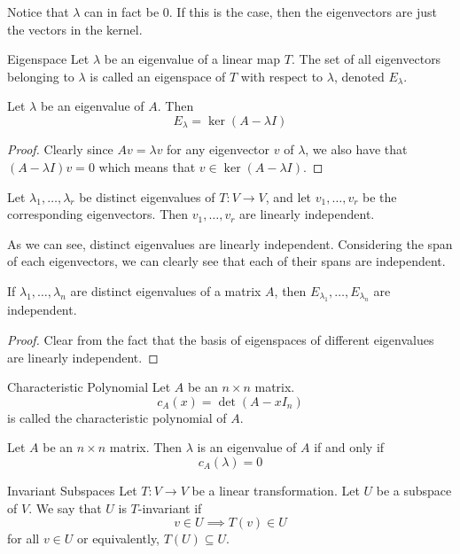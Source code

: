 Notice that $\lambda$ can in fact be $0$. If this is the case, then the eigenvectors are just the vectors in the kernel. 

\begin{defn}{Eigenspace}{} Let $\lambda$ be an eigenvalue of a linear map $T$. The set of all eigenvectors belonging to $\lambda$ is called an eigenspace of $T$ with respect to $\lambda$, denoted $E_\lambda$. 
\end{defn}

\begin{lmm}{}{} Let $\lambda$ be an eigenvalue of $A$. Then $$E_\lambda=\ker(A-\lambda I)$$ \tcbline
\begin{proof}
Clearly since $Av=\lambda v$ for any eigenvector $v$ of $\lambda$, we also have that $(A-\lambda I)v=0$ which means that $v\in\ker(A-\lambda I)$. 
\end{proof}
\end{lmm}

\begin{prp}{}{} Let $\lambda_1,\dots,\lambda_r$ be distinct eigenvalues of $T:V\to V$, and let $v_1,\dots,v_r$ be the corresponding eigenvectors. Then $v_1,\dots,v_r$ are linearly independent. 
\end{prp}

As we can see, distinct eigenvalues are linearly independent. Considering the span of each eigenvectors, we can clearly see that each of their spans are independent. 

\begin{prp}{}{} If $\lambda_1,\dots,\lambda_n$ are distinct eigenvalues of a matrix $A$, then $E_{\lambda_1},\dots,E_{\lambda_n}$ are independent. \tcbline
\begin{proof}
Clear from the fact that the basis of eigenspaces of different eigenvalues are linearly independent. 
\end{proof}
\end{prp}

\begin{defn}{Characteristic Polynomial}{} Let $A$ be an $n\times n$ matrix. $$c_A(x)=\det(A-xI_n)$$ is called the characteristic polynomial of $A$. 
\end{defn}

\begin{prp}{}{} Let $A$ be an $n\times n$ matrix. Then $\lambda$ is an eigenvalue of $A$ if and only if $$c_A(\lambda)=0$$
\end{prp}

\begin{defn}{Invariant Subspaces}{} Let $T:V\to V$ be a linear transformation. Let $U$ be a subspace of $V$. We say that $U$ is $T$-invariant if $$v\in U\implies T(v)\in U$$ for all $v\in U$ or equivalently, $T(U)\subseteq U$. 
\end{defn}

